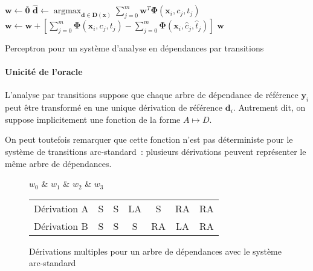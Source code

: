 \documentclass[11pt,openany]{book}
\begin{document}
\begin{algorithm}[htbp]
\begin{algorithmic}[1]
\State $\mathbf{w} \gets \bar{\mathbf{0}}$
\State
$\hat{\mathbf{d}} \gets \mathop{\text{argmax}}_{\mathbf{d}\in
  \mathbf{D}(\mathbf{x})} 
\sum_{j = 0}^m \mathbf{w}^T \boldsymbol\Phi(\mathbf{x}_i,c_j,t_j)$
     \State $\mathbf{w} \gets  \mathbf{w} +
     \left[ \sum_{j=0}^m \boldsymbol\Phi(\mathbf{x}_i,c_j,t_j) 
       - \sum_{j=0}^m \boldsymbol\Phi(\mathbf{x}_i,\hat{c}_j,\hat{t}_j)   \right]$ 
\EndIf
\EndFor
\EndFor
\State \Return $\mathbf{w}$
\EndFunction
\end{algorithmic}
\caption{\label{perceptron-AS}Perceptron pour un système d'analyse
  en dépendances par transitions}
\end{algorithm}


\paragraph{Unicité de l'oracle}
L'analyse par transitions suppose que chaque arbre de dépendance de
référence $\mathbf{y}_i$ peut être transformé en une unique dérivation de
référence $\mathbf{d}_i$. Autrement dit, on suppose implicitement une fonction de la forme
$A \mapsto D$. 

On peut toutefois remarquer que cette fonction n'est pas déterministe pour le
système de transitions arc-standard~: plusieurs dérivations peuvent
représenter le même arbre de dépendances.

\begin{figure}[htbp]
\begin{center}
\begin{dependency}
\begin{deptext}[column sep=.5cm]
$w_0$ \& $w_1$ \& $w_2$ \& $w_3$\\
\end{deptext}
\end{dependency}

\begin{tabular}{l|cccccc}\toprule
Dérivation A&S&S&LA&S&RA&RA\\
Dérivation B & S&S&S&RA&LA&RA\\\bottomrule
\end{tabular}
\end{center}
\caption{Dérivations multiples pour un arbre de dépendances avec le
  système arc-standard}
\end{figure}
\end{document}
